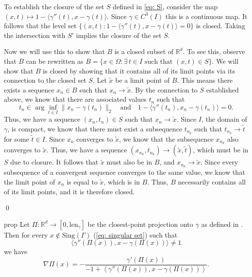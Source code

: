 \documentclass[11pt]{article}
\begin{document}
To establish the closure of the set $S$ defined in \cref{eq: S}, consider the map $(x,t) \mapsto 1 - \langle \gamma''(t), x - \gamma(t)\rangle$. Since $\gamma \in C^3(I)$ this is a continuous map. It follows that the level set $\{(x,t) : 1 - \langle \gamma''(t), x - \gamma(t)\rangle = 0\}$ is closed. Taking the intersection with $S'$ implies the closure of the set $S$. 

Now we will use this to show that $B$ is a closed subset of $\mathbb{R}^d$. To see this, observe that $B$ can be rewritten as $B = \{x \in \Omega: \exists \, t \in I \text{ such that }(x,t) \in S\}.$ We will show that $B$ is closed by showing that it contains all of its limit points via its connection to the closed set $S$. Let $\tilde{x}$ be a limit point of $B$. This means there exists a sequence $x_n \in B$ such that $x_n\rightarrow \tilde{x}$. By the connection to $S$ established above, we know that there are associated values $t_n$ such that 
\[t_n \in \arg\inf_{t \in I}\|x_n - \gamma(t_n)\|_2 \quad \text{and} \quad 1 - \langle\gamma''(t_n), x_n - \gamma(t_n)\rangle = 0.\]
Thus, we have a sequence $(x_n, t_n) \in S$ such that $x_n \rightarrow \tilde{x}$. Since $I$, the domain of $\gamma$, is compact, we know that there must exist a subsequence $t_{n_k}$ such that $t_{n_k}\rightarrow \tilde{t}$ for some $\tilde{t} \in I$. Since $x_n$ converges to $\tilde{x}$, we know that the subsequence $x_{n_k}$ also converges to $\tilde{x}$. Thus, we have a sequence $(x_{n_k}, t_{n_k}) \rightarrow (\tilde{x},\tilde{t})$, which must be in $S$ due to closure. It follows that $\tilde{x}$ must also be in $B$, and $x_{n_k} \rightarrow \tilde{x}$. Since every subsequence of a convergent sequence converges to the same value, we know that the limit point of $x_{n}$ is equal to $\tilde{x}$, which is in $B$. Thus, $B$ necessarily contains all of its limit points, and it is therefore closed.  

\qed{}



\begin{restatable}{prop}{} \label{prop: proj gradient}
    Let $\Pi: \mathbb{R}^d \rightarrow [0, \text{len}_{\gamma}]$ be the closest-point projection onto $\gamma$ as defined in . Then for every $x \notin \overline{\text{Sing}(\Gamma)}$ (\cref{eq: singular set}) such that 
    \[\langle\gamma''(\Pi(x)), x - \gamma(\Pi(x))\rangle \neq 1\]
    we have 
    \[\nabla\Pi(x)  = -\frac{\gamma'(\Pi(x))}{-1 + \left\langle\gamma''(\Pi(x)), x - \gamma(\Pi(x))\right\rangle}.\]
\end{restatable}
\end{document}
